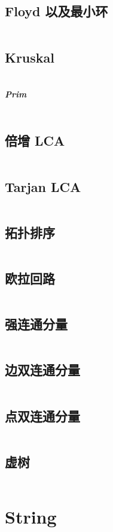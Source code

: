 \documentclass[titlepage, a4paper]{article}
\begin{document}
\begin{multicols}{2}
\begin{spacing}{0.6}
			 	\subsection{Floyd 以及最小环}
			 		\inputminted{cpp}{src/Graph/Floyd.cpp}
			 	\subsection{Kruskal}
			 		\inputminted{cpp}{src/Graph/Kruskal.cpp}
			 	\subparagraph{Prim}
			 		\inputminted{cpp}{src/Graph/Prim.cpp}
			 	\subsection{倍增 LCA}
			 		\inputminted{cpp}{src/Graph/Multiper_lca.cpp}
			 	\subsection{Tarjan LCA}
			 		\inputminted{cpp}{src/Graph/Tarjan_Lca.cpp}
			 	\subsection{拓扑排序}
			 		\inputminted{cpp}{src/Graph/Topo_sort.cpp}
			 	\subsection{欧拉回路}
			 		\inputminted{cpp}{src/Graph/Euler_path.cpp}
			 	\subsection{强连通分量}
			 		\inputminted{cpp}{src/Graph/Tarjan_scc.cpp}
			 	\subsection{边双连通分量}
			 		\inputminted{cpp}{src/Graph/Tarjan_edcc.cpp}
			 	\subsection{点双连通分量}
			 		\inputminted{cpp}{src/Graph/Tarjan_vdcc.cpp}
			 	\subsection{虚树}
			 		\inputminted{cpp}{src/Graph/Virtual_tree.cpp}
			 \section{String}

\end{spacing}
\end{multicols}
\end{document}
